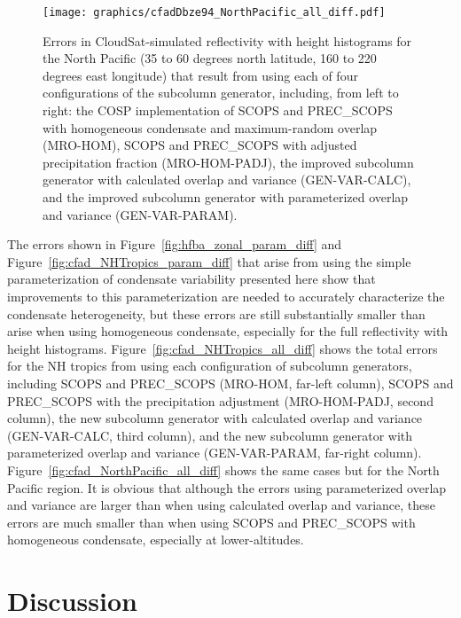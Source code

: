 \begin{figure}[tp]
\centering
\texttt{[image: graphics/cfadDbze94\_NorthPacific\_all\_diff.pdf]}
\caption{\label{fig:cfad_NorthPacific_all_diff}Errors in
CloudSat-simulated reflectivity with height histograms for the North
Pacific (35 to 60 degrees north latitude, 160 to 220 degrees east
longitude) that result from using each of four configurations of the
subcolumn generator, including, from left to right: the COSP
implementation of SCOPS and PREC\_SCOPS with homogeneous condensate and
maximum-random overlap (MRO-HOM), SCOPS and PREC\_SCOPS with adjusted
precipitation fraction (MRO-HOM-PADJ), the improved subcolumn generator
with calculated overlap and variance (GEN-VAR-CALC), and the improved
subcolumn generator with parameterized overlap and variance
(GEN-VAR-PARAM).}\label{fig:cfadux5fNorthPacificux5fallux5fdiff}
\end{figure}

The errors shown in Figure~\ref{fig:hfba_zonal_param_diff} and
Figure~\ref{fig:cfad_NHTropics_param_diff} that arise from using the
simple parameterization of condensate variability presented here show
that improvements to this parameterization are needed to accurately
characterize the condensate heterogeneity, but these errors are still
substantially smaller than arise when using homogeneous condensate,
especially for the full reflectivity with height histograms.
Figure~\ref{fig:cfad_NHTropics_all_diff} shows the total errors for the
NH tropics from using each configuration of subcolumn generators,
including SCOPS and PREC\_SCOPS (MRO-HOM, far-left column), SCOPS and
PREC\_SCOPS with the precipitation adjustment (MRO-HOM-PADJ, second
column), the new subcolumn generator with calculated overlap and
variance (GEN-VAR-CALC, third column), and the new subcolumn generator
with parameterized overlap and variance (GEN-VAR-PARAM, far-right
column). Figure~\ref{fig:cfad_NorthPacific_all_diff} shows the same
cases but for the North Pacific region. It is obvious that although the
errors using parameterized overlap and variance are larger than when
using calculated overlap and variance, these errors are much smaller
than when using SCOPS and PREC\_SCOPS with homogeneous condensate,
especially at lower-altitudes.

\section{Discussion}\label{sec:subgrid2Discussion}

